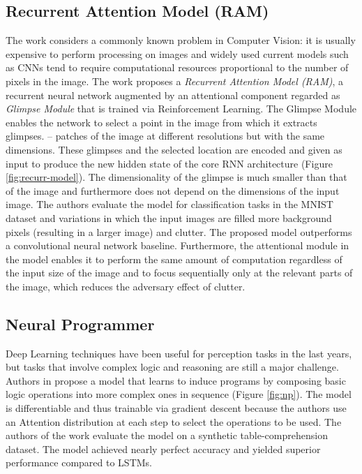 \documentclass[12pt]{article}
\begin{document}
\subsection{Recurrent Attention Model (RAM)}
The work \cite{ref:rec-models} considers a commonly known problem in Computer Vision: it is usually
expensive to perform processing on images and widely used current models such as
CNNs tend to require computational resources proportional to the number of pixels in the image.
The work proposes a \emph{Recurrent Attention Model (RAM)}, a recurrent neural network augmented by
an attentional component regarded as \emph{Glimpse Module} that is trained via Reinforcement Learning.
The Glimpse Module enables the network to select a point in the image from which it extracts glimpses.
-- patches of the image at different resolutions but with the same dimensions.
These glimpses and the selected location are encoded and given as input to produce
the new hidden state of the core RNN architecture (Figure \ref{fig:recurr-model}).
The dimensionality of the glimpse is much smaller than that of the image and furthermore does not depend
on the dimensions of the input image.
The authors evaluate the model for classification tasks in the MNIST~\cite{ref:mnist} dataset and variations
in which the input images are filled more background pixels (resulting in a larger image) and clutter.
The proposed model outperforms a convolutional neural network baseline.
Furthermore, the attentional module in the model enables it to perform the same amount of computation
regardless of the input size of the image and to focus sequentially only at the relevant parts of the image,
which reduces the adversary effect of clutter.

\subsection{Neural Programmer}
Deep Learning techniques have been useful for perception tasks in the last years, but tasks that involve
complex logic and reasoning are still a major challenge.
Authors in \cite{ref:np} propose a model that learns to induce programs by composing basic logic operations
into more complex ones in sequence (Figure \ref{fig:np}).
The model is differentiable and thus trainable via gradient descent because the authors use an Attention
distribution at each step to select the operations to be used.
The authors of the work evaluate the model on a synthetic table-comprehension dataset.
The model achieved nearly perfect accuracy and yielded superior performance compared to LSTMs.
\end{document}
